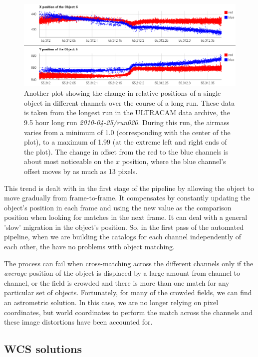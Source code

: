 \begin{figure}
  \centering
  \includegraphics[width=140mm]{images/position_drift_longrun.png}
  \caption{Another plot showing the change in relative positions of a single object in different channels over the course of a long run. These data is taken from the longest run in the ULTRACAM data archive, the 9.5 hour long run \emph{2010-04-25/run020}. During this run, the airmass varies from a minimum of 1.0 (corresponding with the center of the plot), to a maximum of 1.99 (at the extreme left and right ends of the plot). The change in offset from the red to the blue channels is about most noticeable on the $x$ position, where the blue channel's offset moves by as much as 13 pixels. }
\label{fig:positiondriftlongrun}
\end{figure}

This trend is dealt with in the first stage of the pipeline by allowing the object to move gradually from frame-to-frame. It compensates by  constantly updating the object's position in each frame and using the new value as the comparison position when looking for matches in the next frame. It can deal with a general 'slow' migration in the object's position. So, in the first pass of the automated pipeline, when we are building the catalogs for each channel independently of each other, the have no problems with object matching. 

The process can fail when cross-matching across the different channels only if the \emph{average} position of the object is displaced by a large amount from channel to channel, or the field is crowded and there is more than one match for any particular set of objects. Fortunately, for many of the crowded fields, we can find an astrometric solution. In this case, we are no longer relying on pixel coordinates, but world coordinates to perform the match across the channels and these image distortions have been accounted for. 

\subsection{WCS solutions}\label{sect:astrometry}

